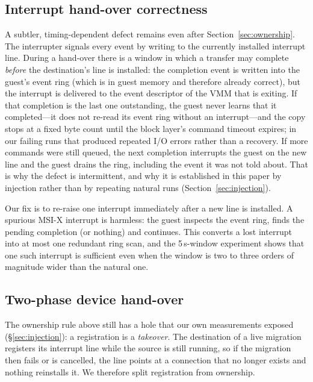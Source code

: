 \documentclass[10pt,conference]{IEEEtran}
\begin{document}
\subsection{Interrupt hand-over correctness}
\label{sec:interrupt}
A subtler, timing-dependent defect remains even after
Section~\ref{sec:ownership}. The interrupter signals every event by writing to
the currently installed interrupt line. During a hand-over there is a window in
which a transfer may complete \emph{before} the destination's line is
installed: the completion event is written into the guest's event ring (which
is in guest memory and therefore already correct), but the interrupt is
delivered to the event descriptor of the VMM that is exiting. If that completion
is the last one outstanding, the guest never learns that it completed---it does
not re-read its event ring without an interrupt---and the copy stops at a fixed
byte count until the block layer's command timeout expires; in our failing runs
that produced repeated I/O errors rather than a recovery. If more commands were
still queued, the next completion interrupts the guest on the new line and the
guest drains the ring, including the event it was not told about. That is why
the defect is intermittent, and why it is established in this paper by injection
rather than by repeating natural runs (Section~\ref{sec:injection}).

Our fix is to re-raise one interrupt immediately after a new line is installed.
A spurious MSI-X interrupt is harmless: the guest inspects the event ring,
finds the pending completion (or nothing) and continues. This converts a lost
interrupt into at most one redundant ring scan, and the 5\,s-window experiment
shows that one such interrupt is sufficient even when the window is two to
three orders of magnitude wider than the natural one.

\subsection{Two-phase device hand-over}
\label{sec:twophase}
The ownership rule above still has a hole that our own measurements exposed
(\S\ref{sec:injection}): a registration is a \emph{takeover}. The destination of
a live migration registers its interrupt line while the source is still running,
so if the migration then fails or is cancelled, the line points at a connection
that no longer exists and nothing reinstalls it. We therefore split registration
from ownership.
\end{document}
